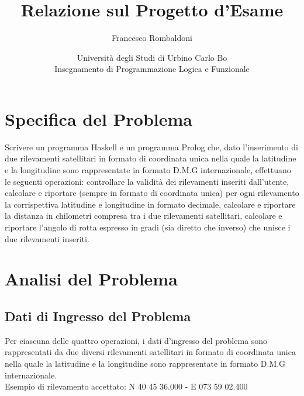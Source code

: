 \documentclass{article}
\title{\textbf{Relazione sul Progetto d'Esame}}
\author{Francesco Rombaldoni}
\date{\small Università degli Studi di Urbino Carlo Bo\\
	Insegnamento di Programmazione Logica e Funzionale}
\begin{document}
	\maketitle
	
	
\newpage

\section{Specifica del Problema}
Scrivere un programma Haskell e un programma Prolog che, dato l'inserimento di due rilevamenti satellitari in formato di coordinata unica nella quale la latitudine e la longitudine sono rappresentate in formato D.M.G internazionale, effettuano le seguenti operazioni: controllare la validità dei rilevamenti inseriti dall'utente, calcolare e riportare (sempre in formato di coordinata unica) per ogni rilevamento la corrispettiva latitudine e longitudine in formato decimale, calcolare e riportare la distanza in chilometri compresa tra i due rilevamenti satellitari, calcolare e riportare l'angolo di rotta espresso in gradi (sia diretto che inverso) che unisce i due rilevamenti inseriti.
\newline
\newline
\newpage
			
\section{Analisi del Problema}
\subsection{Dati di Ingresso del Problema}
Per ciascuna delle quattro operazioni, i dati d'ingresso del problema sono rappresentati da due diversi rilevamenti satellitari in formato di coordinata unica nella quale la latitudine e la longitudine sono rappresentate in formato D.M.G internazionale. \\
Esempio di rilevamento accettato: N 40 45 36.000 - E 073 59 02.400
\end{document}
